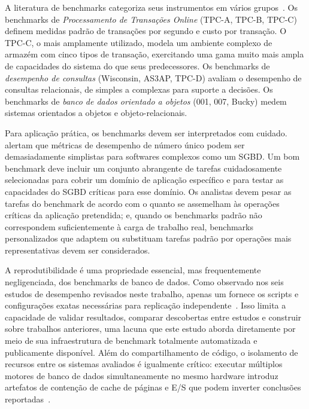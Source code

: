 A literatura de benchmarks categoriza seus instrumentos em vários grupos~\citep{Ramakrishnan2003}.
Os benchmarks de \textit{Processamento de Transações Online} (TPC-A, TPC-B, TPC-C) definem
medidas padrão de transações por segundo e custo por transação. O TPC-C, o mais amplamente
utilizado, modela um ambiente complexo de armazém com cinco tipos de transação, exercitando uma
gama muito mais ampla de capacidades do sistema do que seus predecessores. Os benchmarks de
\textit{desempenho de consultas} (Wisconsin, AS3AP, TPC-D) avaliam o desempenho de consultas
relacionais, de simples a complexas para suporte a decisões. Os benchmarks de \textit{banco de
dados orientado a objetos} (001, 007, Bucky) medem sistemas orientados a objetos e
objeto-relacionais.

Para aplicação prática, os benchmarks devem ser interpretados com cuidado.
\cite{Ramakrishnan2003} alertam que métricas de desempenho de número único podem ser
demasiadamente simplistas para softwares complexos como um SGBD. Um bom benchmark deve incluir
um conjunto abrangente de tarefas cuidadosamente selecionadas para cobrir um domínio de
aplicação específico e para testar as capacidades do SGBD críticas para esse domínio. Os
analistas devem pesar as tarefas do benchmark de acordo com o quanto se assemelham às operações
críticas da aplicação pretendida; e, quando os benchmarks padrão não correspondem
suficientemente à carga de trabalho real, benchmarks personalizados que adaptem ou substituam
tarefas padrão por operações mais representativas devem ser considerados.

A reprodutibilidade é uma propriedade essencial, mas frequentemente negligenciada, dos benchmarks
de banco de dados. Como observado nos seis estudos de desempenho revisados neste trabalho, apenas um
fornece os scripts e configurações exatas necessárias para replicação
independente~\citep{pereira2023mulletbench}. Isso limita a capacidade
de validar resultados, comparar descobertas entre estudos e construir sobre trabalhos anteriores,
uma lacuna que este estudo aborda diretamente por meio de sua infraestrutura de benchmark
totalmente automatizada e publicamente disponível.
Além do compartilhamento de código, o isolamento de recursos entre os sistemas avaliados é
igualmente crítico: executar múltiplos motores de banco de dados simultaneamente no mesmo
hardware introduz artefatos de contenção de cache de páginas e E/S que podem inverter
conclusões reportadas~\citep{shapira2016pitfalls}.
